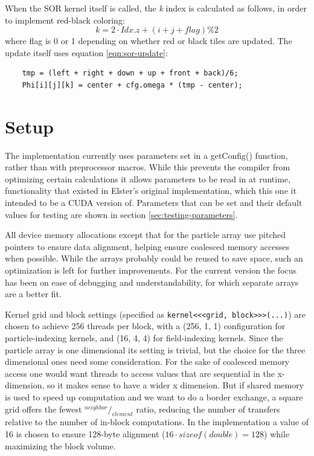 When the SOR kernel itself is called, the \emph{k} index is calculated as follows, in order to implement red-black
coloring:
$$k = 2 \cdot Idx.z + (i + j + flag) \% 2 $$
where flag is 0 or 1 depending on whether red or black tiles are updated. The update itself uses equation \ref{eqn:sor-update}:

\begin{lstlisting}
	tmp = (left + right + down + up + front + back)/6;
	Phi[i][j][k] = center + cfg.omega * (tmp - center);
\end{lstlisting}


\section{Setup}\label{sec:implementation-setup}
The implementation currently uses parameters set in a getConfig() function, rather than with preprocessor macros. While
this prevents the compiler from optimizing certain calculations it allows parameters to be read in at runtime,
functionality that existed in Elster's original implementation, which this one it intended to be a CUDA version of.
Parameters that can be set and their default values for testing are shown in section \ref{sec:testing-parameters}.

All device memory allocations except that for the particle array use pitched pointers to ensure data alignment, helping
ensure coalesced memory accesses when possible. While the arrays probably could be reused to save space, such an
optimization is left for further improvements. For the current version the focus has been on ease of debugging and
understandability, for which separate arrays are a better fit.

Kernel grid and block settings (specified as \lstinline|kernel<<<grid, block>>>(...)|)
are chosen to achieve 256 threads per block, with a (256, 1, 1) configuration for particle-indexing kernels, and (16, 4, 4)
for field-indexing kernels. Since the particle array is one dimensional its setting is trivial, but the choice for the
three dimensional ones need some consideration. For the sake of coalesced memory access one would want threads to access
values that are sequential in the x-dimension, so it makes sense to have a wider x dimension. But if shared memory is
used to speed up computation and we want to do a border exchange, a square grid offers the fewest $^{neighbor}\!/_{element}$ ratio,
reducing the number of transfers relative to the number of in-block computations. In the implementation a value of 16 is
chosen to ensure 128-byte alignment ($16 \cdot sizeof(double) = 128$) while maximizing the block volume.

